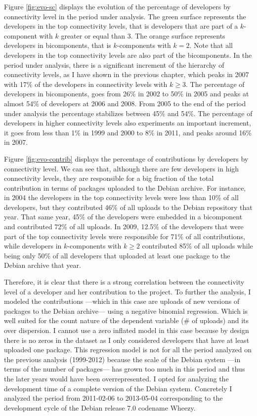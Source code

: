 Figure \ref{fig:evo-sc} displays the evolution of the percentage of developers by connectivity level in the period under analysis. The green surface represents the developers in the top connectivity levels, that is developers that are part of a $k$-component with $k$ greater or equal than 3. The orange surface represents developers in bicomponents, that is $k$-components with $k=2$. Note that all developers in the top connectivity levels are also part of the bicomponents. In the period under analysis, there is a significant increment of the hierarchy of connectivity levels, as I have shown in the previous chapter, which peaks in 2007 with 17\% of the developers in connectivity levels with $k \ge 3$. The percentage of developers in bicomponents, goes from 26\% in 2002 to 50\% in 2005 and peaks at almost 54\% of developers at 2006 and 2008. From 2005 to the end of the period under analysis the percentage stabilizes between 45\% and 54\%. The percentage of developers in higher connectivity levels also experiments an important increment, it goes from less than 1\% in 1999 and 2000 to 8\% in 2011, and peaks around 16\% in 2007.

Figure \ref{fig:evo-contrib} displays the percentage of contributions by developers by connectivity level. We can see that, although there are few developers in high connectivity levels, they are responsible for a big fraction of the total contribution in terms of packages uploaded to the Debian archive. For instance, in 2004 the developers in the top connectivity levels were less than 10\% of all developers, but they contributed 46\% of all uploads to the Debian repository that year. That same year, 45\% of the developers were embedded in a bicomponent and contributed 72\% of all uploads. In 2009, 12.5\% of the developers that were part of the top connectivity levels were responsible for 71\% of all contributions, while developers in $k$-components with $k \ge 2$ contributed 85\% of all uploads while being only 50\% of all developers that uploaded at least one package to the Debian archive that year. 

Therefore, it is clear that there is a strong correlation between the connectivity level of a developer and her contribution to the project. To further the analysis, I modeled the contributions ---which in this case are uploads of new versions of packages to the Debian archive--- using a negative binomial regression. Which is well suited for the count nature of the dependent variable (\# of uploads) and its over dispersion. I cannot use a zero inflated model in this case because by design there is no zeros in the dataset as I only considered developers that have at least uploaded one package. This regression model is not for all the period analyzed on the previous analysis (1999-2012) because the scale of the Debian system ---in terms of the number of packages--- has grown too much in this period and thus the later years would have been overrepresented. I opted for analyzing the development time of a complete version of the Debian system. Concretely I analyzed the period from 2011-02-06 to 2013-05-04  corresponding to the development cycle of the Debian release 7.0 codename Wheezy.

